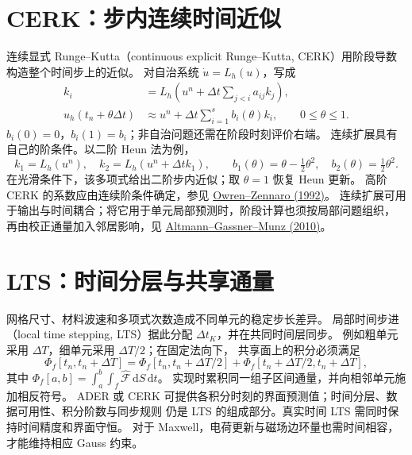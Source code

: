\documentclass[UTF8,11pt,openany]{ctexbook}
\numberwithin{equation}{chapter}
\theoremstyle{definition}
\theoremstyle{remark}
\newcommand{\dd}{\mathrm d}
\begin{document}
\section{CERK：步内连续时间近似}\label{sec:cerk}
连续显式 Runge--Kutta（continuous explicit Runge--Kutta, CERK）用阶段导数构造整个时间步上的近似。
对自治系统 $\dot u=L_h(u)$，写成
\begin{equation}\label{eq:cerk}
\begin{aligned}
k_i&=L_h\left(u^n+\Delta t\sum_{j<i}a_{ij}k_j\right),\\
u_h(t_n+\theta\Delta t)&\approx u^n+
\Delta t\sum_{i=1}^{s}b_i(\theta)k_i,\qquad 0\leq\theta\leq1.
\end{aligned}
\end{equation}
$b_i(0)=0$，$b_i(1)=b_i$；非自治问题还需在阶段时刻评价右端。
连续扩展具有自己的阶条件。以二阶 Heun 法为例，
\begin{equation}\label{eq:cerk-heun}
k_1=L_h(u^n),\quad k_2=L_h(u^n+\Delta t k_1),\qquad
b_1(\theta)=\theta-\tfrac12\theta^2,\quad
b_2(\theta)=\tfrac12\theta^2.
\end{equation}
在光滑条件下，该多项式给出二阶步内近似；取 $\theta=1$ 恢复 Heun 更新。
高阶 CERK 的系数应由连续阶条件确定，参见
\href{https://doi.org/10.1137/0913084}{Owren--Zennaro (1992)}。
连续扩展可用于输出与时间耦合；将它用于单元局部预测时，阶段计算也须按局部问题组织，
再由校正通量加入邻居影响，见
\href{https://congress2.cimne.com/eccomas/proceedings/cfd2010/papers/01008.pdf}{Altmann--Gassner--Munz (2010)}。

\section{LTS：时间分层与共享通量}\label{sec:lts}
网格尺寸、材料波速和多项式次数造成不同单元的稳定步长差异。
局部时间步进（local time stepping, LTS）据此分配 $\Delta t_K$，并在共同时间层同步。
例如粗单元采用 $\Delta T$，细单元采用 $\Delta T/2$；在固定法向下，
共享面上的积分必须满足
\begin{equation}\label{eq:lts-flux}
\Phi_f[t_n,t_n+\Delta T]
=\Phi_f[t_n,t_n+\Delta T/2]
+\Phi_f[t_n+\Delta T/2,t_n+\Delta T],
\end{equation}
其中 $\Phi_f[a,b]=\int_a^b\int_f\widehat{\mathcal F}\,\dd S\,\dd t$。
实现时累积同一组子区间通量，并向相邻单元施加相反符号。
ADER 或 CERK 可提供各积分时刻的界面预测值；时间分层、数据可用性、积分阶数与同步规则
仍是 LTS 的组成部分。真实时间 LTS 需同时保持时间精度和界面守恒。
对于 Maxwell，电荷更新与磁场边环量也需时间相容，才能维持相应 Gauss 约束。
\end{document}
